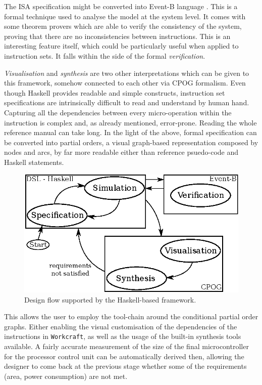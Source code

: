 \documentclass[conference]{IEEEtran}
\begin{document}
The ISA specification might be converted into Event-B language \cite{eventB}. This is a
formal technique used to analyse the model at the system level. It comes with some theorem
provers which are able to verify the consistency of the system, proving that there are 
no inconsistencies between instructions. This is an interesting feature itself, which could
be particularly useful when applied to instruction sets. It falls within the side of the
formal \textit{verification}.

\textit{Visualisation} and \textit{synthesis} are two other
interpretations which can be given to this framework, somehow connected to each other via
CPOG formalism. Even though Haskell provides readable and simple constructs, instruction
set specifications are intrinsically difficult to read and understand by human hand.
Capturing all the dependencies between every micro-operation within the instruction is
complex and, as already mentioned, error-prone. Reading the whole reference manual can take
long. In the light of the above, formal specification can be converted into partial orders,
a visual graph-based representation composed by nodes and arcs, by far more readable either
than reference psuedo-code and Haskell statements.

\begin{figure}[ht!]
\begin{center}
	\includegraphics[width=\linewidth]{IMG/flow.eps}
	\caption{Design flow supported by the Haskell-based framework.}
	\label{fig:flow}
\end{center}
\end{figure}

This allows the user to employ the tool-chain around the conditional partial order
graphs. Either enabling the visual customisation of the dependencies of the instructions in 
\verb|Workcraft|, as well as the usage of the built-in synthesis tools available. A fairly
accurate measurement of the size of the final microcontroller for the processor control
unit can be automatically derived then, allowing the designer to come back at the previous
stage whether some of the requirements (area, power consumption) are not met.
\end{document}
